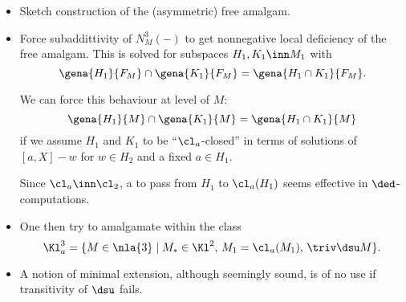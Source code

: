 \documentclass[a4paper,11pt,german,english]{report}
\begin{document}
\begin{itemize}
\item[]Sketch construction of the (asymmetric) free amalgam.
\item[]Force subaddittivity of $N^{3}_{M}(-)$ to get nonnegative local deficiency
of the free amalgam. This is solved for subspaces $H_{1},K_{1}\inn M_{1}$ with
$$\gena{H_{1}}{F_{M}}\cap\gena{K_{1}}{F_{M}}=\gena{H_{1}\cap K_{1}}{F_{M}}.$$

We can force this behaviour at level of $M$:
$$\gena{H_{1}}{{M}}\cap\gena{K_{1}}{{M}}=\gena{H_{1}\cap K_{1}}{{M}}$$
if we assume $H_{1}$ and $K_{1}$ to be ``$\cl_{a}$-closed'' in terms
of solutions of $[a,X]-w$ for $w\in H_{2}$ and a fixed $a\in H_{1}$.

Since $\cl_{a}\inn\cl_{2}$, a to pass from $H_{1}$ to $\cl_{a}(H_{1})$ seems
effective in $\ded$-computations.

\item[]One then try to amalgamate within the class
$$\Kl^{3}_{a}=\{M\in\nla{3}\mid M_{*}\in\Kl^{2},\,M_{1}=\cl_{a}(M_{1}),\,\triv\dsu M\}.$$

\item[]A notion of minimal extension, although seemingly sound, is of no use
if transitivity of $\dsu$ fails.
\end{itemize}
\end{document}
